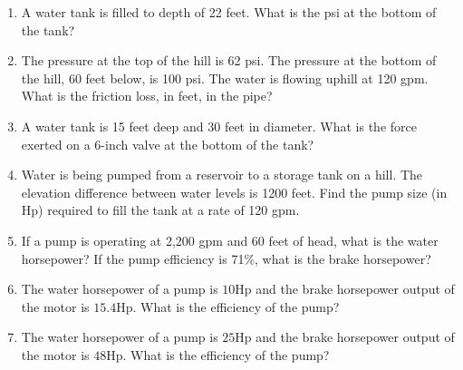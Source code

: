 \begin{enumerate}[1.]
\item A water tank is filled to depth of 22 feet. What is the psi at the bottom of the tank?\\

\item The pressure at the top of the hill is 62 psi. The pressure at the bottom of the hill, 60 feet below, is 100 psi. The water is flowing uphill at 120 gpm. What is the friction loss, in feet, in the pipe?\\

\item A water tank is 15 feet deep and 30 feet in diameter. What is the force exerted on a 6-inch valve at the bottom of the tank?\\

  \item Water is being pumped from a reservoir to a storage tank on a hill. The elevation difference between water levels is 1200 feet. Find the pump size (in Hp) required to fill the tank at a rate of 120 gpm.\\

\item If a pump is operating at 2,200 gpm and 60 feet of head, what is the water horsepower? If the pump efficiency is 71\%, what is the brake horsepower?\\


\item The water horsepower of a pump is $10 \mathrm{Hp}$ and the brake horsepower output of the motor is $15.4 \mathrm{Hp}$. What is the efficiency of the pump?\\

 \vspace{0.2cm}
 \item The water horsepower of a pump is $25 \mathrm{Hp}$ and the brake horsepower output of the motor is $48 \mathrm{Hp}$. What is the efficiency of the pump?\\

\end{enumerate}


